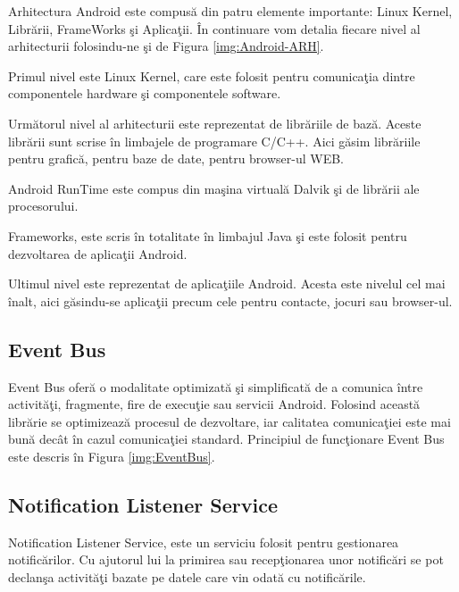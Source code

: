 Arhitectura Android este compus\u{a} din patru elemente importante: Linux Kernel, Libr\u{a}rii, FrameWorks \c{s}i Aplica\c{t}ii. \^{I}n continuare vom detalia fiecare nivel al arhitecturii folosindu-ne \c{s}i de Figura \ref{img:Android-ARH}.

	Primul nivel este Linux Kernel, care este folosit pentru comunica\c{t}ia dintre componentele hardware \c{s}i componentele software. 

	Urm\u{a}torul nivel al arhitecturii este reprezentat de libr\u{a}riile de baz\u{a}. Aceste libr\u{a}rii sunt scrise \^{i}n limbajele de programare C/C++. Aici g\u{a}sim libr\u{a}riile pentru grafic\u{a}, pentru baze de date, pentru browser-ul WEB.

	Android RunTime este compus din ma\c{s}ina virtual\u{a} Dalvik \c{s}i de libr\u{a}rii ale procesorului.

	Frameworks, este scris \^{i}n totalitate \^{i}n limbajul Java \c{s}i este folosit pentru dezvoltarea de aplica\c{t}ii Android.
	
	Ultimul nivel este reprezentat de aplica\c{t}iile Android. Acesta este nivelul cel mai \^{i}nalt, aici g\u{a}sindu-se aplica\c{t}ii precum cele pentru contacte, jocuri sau browser-ul. 
	


\subsection{Event Bus}

Event Bus ofer\u{a} o modalitate optimizat\u{a} \c{s}i simplificat\u{a} de a comunica \^{i}ntre activit\u{a}\c{t}i, fragmente, fire de execu\c{t}ie sau servicii Android. Folosind aceast\u{a} libr\u{a}rie se optimizeaz\u{a} procesul de dezvoltare, iar calitatea comunica\c{t}iei este mai bun\u{a} dec\^{a}t \^{i}n cazul comunica\c{t}iei standard. Principiul de func\c{t}ionare Event Bus este descris \^{i}n Figura \ref{img:EventBus}.


\subsection{Notification Listener Service}

Notification Listener Service, este un serviciu folosit pentru gestionarea notific\u{a}rilor. Cu ajutorul lui la primirea sau recep\c{t}ionarea unor notific\u{a}ri se pot declan\c{s}a activit\u{a}\c{t}i bazate pe datele care vin odat\u{a} cu notific\u{a}rile.

